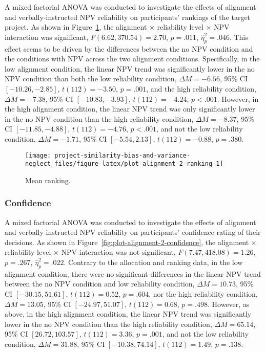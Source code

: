 \documentclass[
  english,
  man, donotrepeattitle,floatsintext]{apa7}
\theoremstyle{definition}
\theoremstyle{definition}
\theoremstyle{definition}
\theoremstyle{definition}
\theoremstyle{remark}
\begin{document}
A mixed factorial ANOVA was conducted to investigate the effects of alignment
and verbally-instructed NPV reliability on participants' rankings of the
target project. As shown in Figure~\ref{fig:plot-alignment-2-ranking}, the
alignment \(\times\) reliability level \(\times\) NPV interaction was
significant,
\(F(6.62, 370.54) = 2.70\), \(p = .011\), \(\hat{\eta}^2_p = .046\). This
effect seems to be driven by the differences between the no NPV condition and
the conditions with NPV across the two alignment conditions. Specifically, in
the low alignment condition, the linear NPV trend was significantly lower in the
no NPV condition than both the low reliability condition,
\(\Delta M = -6.56\), 95\% CI \([-10.26, -2.85]\), \(t(112) = -3.50\), \(p = .001\), and the high
reliability condition, \(\Delta M = -7.38\), 95\% CI \([-10.83, -3.93]\), \(t(112) = -4.24\), \(p < .001\).
However, in the high alignment condition, the linear NPV trend was only
significantly lower in the no NPV condition than the high reliability condition,
\(\Delta M = -8.37\), 95\% CI \([-11.85, -4.88]\), \(t(112) = -4.76\), \(p < .001\), and not the low
reliability condition, \(\Delta M = -1.71\), 95\% CI \([-5.54, 2.13]\), \(t(112) = -0.88\), \(p = .380\).



\begin{figure}
\texttt{[image: project-similarity-bias-and-variance-neglect\_files/figure-latex/plot-alignment-2-ranking-1]} \caption{Mean ranking.}\label{fig:plot-alignment-2-ranking}
\end{figure}

\hypertarget{confidence}{%
\subsubsection{Confidence}\label{confidence}}

A mixed factorial ANOVA was conducted to investigate the effects of alignment
and verbally-instructed NPV reliability on participants' confidence rating of
their decisions. As shown in Figure~\ref{fig:plot-alignment-2-confidence}, the
alignment \(\times\) reliability level \(\times\) NPV interaction was not
significant,
\(F(7.47, 418.08) = 1.26\), \(p = .267\), \(\hat{\eta}^2_p = .022\).
Contrary to the allocation and ranking data, in
the low alignment condition, there were no significant differences in the linear
NPV trend between the no NPV condition and low reliability condition,
\(\Delta M = 10.73\), 95\% CI \([-30.15, 51.61]\), \(t(112) = 0.52\), \(p = .604\), nor the high
reliability condition, \(\Delta M = 13.05\), 95\% CI \([-24.97, 51.07]\), \(t(112) = 0.68\), \(p = .498\).
However, as above, in the high alignment condition, the linear NPV trend was
significantly lower in the no NPV condition than the high reliability condition,
\(\Delta M = 65.14\), 95\% CI \([26.72, 103.57]\), \(t(112) = 3.36\), \(p = .001\), and not the low
reliability condition, \(\Delta M = 31.88\), 95\% CI \([-10.38, 74.14]\), \(t(112) = 1.49\), \(p = .138\).
\end{document}
